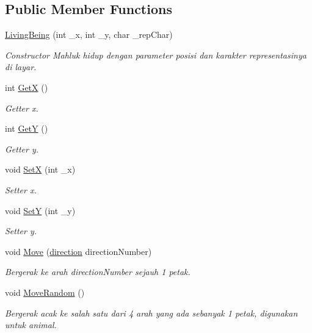 \subsection*{Public Member Functions}
\begin{DoxyCompactItemize}
\item 
\mbox{\hyperlink{classLivingBeing_a564c0c4423b463ee4e0f386400602751}{Living\+Being}} (int \+\_\+x, int \+\_\+y, char \+\_\+rep\+Char)
\begin{DoxyCompactList}\small\item\em Constructor Mahluk hidup dengan parameter posisi dan karakter representasinya di layar. \end{DoxyCompactList}\item 
int \mbox{\hyperlink{classLivingBeing_a013886d4ae3a8e1d9710471486a0bd9e}{GetX}} ()
\begin{DoxyCompactList}\small\item\em Getter x. \end{DoxyCompactList}\item 
int \mbox{\hyperlink{classLivingBeing_a349ac8d394ee2e54b992e7e693d7782b}{GetY}} ()
\begin{DoxyCompactList}\small\item\em Getter y. \end{DoxyCompactList}\item 
void \mbox{\hyperlink{classLivingBeing_a066f825613f93f0d97f644d5f0ce1cb5}{SetX}} (int \+\_\+x)
\begin{DoxyCompactList}\small\item\em Setter x. \end{DoxyCompactList}\item 
void \mbox{\hyperlink{classLivingBeing_a69e58a8fb18b45d41b308dab4f654a37}{SetY}} (int \+\_\+y)
\begin{DoxyCompactList}\small\item\em Setter y. \end{DoxyCompactList}\item 
void \mbox{\hyperlink{classLivingBeing_a5d612696127afb2cca466ff8757dde45}{Move}} (\mbox{\hyperlink{classLivingBeing_a26002fcf620ed05cb9ac2604038b19f1}{direction}} direction\+Number)
\begin{DoxyCompactList}\small\item\em Bergerak ke arah direction\+Number sejauh 1 petak. \end{DoxyCompactList}\item 
void \mbox{\hyperlink{classLivingBeing_a41df7acfc3337b4ae07ae6f107d55a58}{Move\+Random}} ()
\begin{DoxyCompactList}\small\item\em Bergerak acak ke salah satu dari 4 arah yang ada sebanyak 1 petak, digunakan untuk animal. \end{DoxyCompactList}\end{DoxyCompactItemize}
